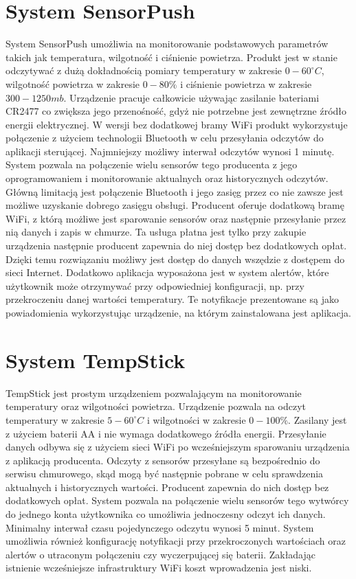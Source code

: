 \section{System SensorPush}
System SensorPush umożliwia na monitorowanie podstawowych parametrów takich jak temperatura,
wilgotność i ciśnienie powietrza. Produkt jest w stanie odczytywać z dużą dokładnością pomiary temperatury
w zakresie $0 - 60 ^\circ C$, wilgotność powietrza w zakresie $0-80\%$ i ciśnienie powietrza w zakresie 
$300 - 1250mb$. Urządzenie pracuje całkowicie używając zasilanie bateriami CR2477 co zwiększa
jego przenośność, gdyż nie potrzebne jest zewnętrzne źródło energii elektrycznej. 
W wersji bez dodatkowej bramy WiFi produkt wykorzystuje połączenie z użyciem technologii
Bluetooth w celu przesyłania odczytów do aplikacji sterującej. 
Najmniejszy możliwy interwał odczytów wynosi 1 minutę.
System pozwala na połączenie wielu sensorów tego producenta z jego
oprogramowaniem i monitorowanie aktualnych oraz historycznych odczytów. Główną limitacją
jest połączenie Bluetooth i jego zasięg przez co nie zawsze jest możliwe uzyskanie dobrego
zasięgu obsługi. Producent oferuje dodatkową bramę WiFi, z którą możliwe jest sparowanie
sensorów oraz następnie przesyłanie przez nią danych i zapis w chmurze. Ta usługa płatna
jest tylko przy zakupie urządzenia następnie producent zapewnia do niej dostęp bez dodatkowych opłat.
Dzięki temu rozwiązaniu możliwy jest dostęp do danych wszędzie z dostępem do sieci Internet.
Dodatkowo aplikacja wyposażona jest w system alertów, które użytkownik może otrzymywać przy odpowiedniej
konfiguracji, np. przy przekroczeniu danej wartości temperatury. Te notyfikacje prezentowane są
jako powiadomienia wykorzystując urządzenie, na którym zainstalowana jest aplikacja.

\section{System TempStick}
TempStick jest prostym urządzeniem pozwalającym na monitorowanie temperatury oraz wilgotności powietrza.
Urządzenie pozwala na odczyt temperatury w zakresie $5 - 60 ^\circ C$ i wilgotności w zakresie $0-100\%$.
Zasilany jest z użyciem baterii AA i nie wymaga dodatkowego źródła energii.
Przesyłanie danych odbywa się z użyciem sieci WiFi po wcześniejszym sparowaniu urządzenia z aplikacją
producenta. Odczyty z sensorów przesyłane są bezpośrednio do serwisu chmurowego, skąd mogą być następnie
pobrane w celu sprawdzenia aktualnych i historycznych wartości. Producent zapewnia do nich dostęp bez
dodatkowych opłat. System pozwala na połączenie wielu sensorów tego wytwórcy do jednego konta
użytkownika co umożliwia jednoczesny odczyt ich danych. Minimalny interwał czasu pojedynczego
odczytu wynosi 5 minut. System umożliwia również konfigurację notyfikacji przy przekroczonych 
wartościach oraz alertów o utraconym połączeniu czy wyczerpującej się baterii. Zakładając istnienie 
wcześniejsze infrastruktury WiFi koszt wprowadzenia jest niski.

